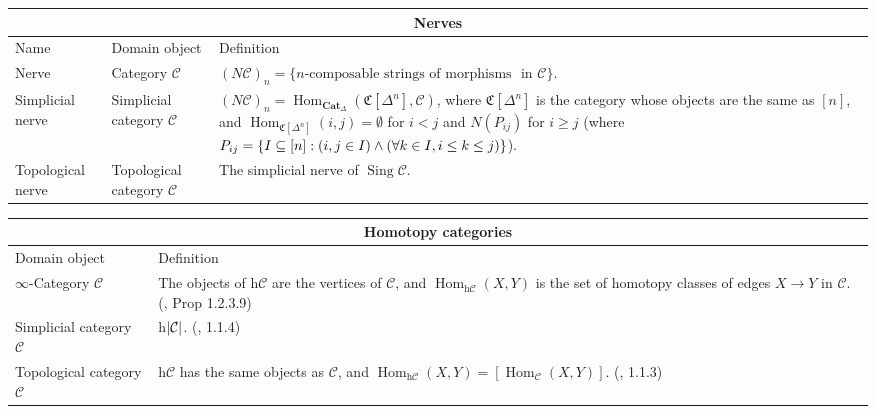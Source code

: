 \documentclass{article}
\DeclareMathOperator{\Hom}{Hom}
\DeclareMathOperator{\Sing}{Sing}
\def\subq{\ensuremath\subseteq}
\begin{document}
\begin{centre}
\begin{tabular}{ |p{3cm}||p{5cm}|p{7cm}|}
 \hline
 \multicolumn{3}{|c|}{Nerves}\\
 \hline
 Name& Domain object & Definition\\
  \hline\hline
  Nerve & Category \(\mathcal{C}\) & \((N\mathcal{C})_n=\text{\{}n\text{-composable strings of morphisms}\) \(\text{ in } \mathcal{C}\text{\}}\). \\
 \hline
 Simplicial nerve & Simplicial category \(\mathcal{C}\) & \((N \mathcal{C})_n=\Hom_{\textbf{Cat}_\Delta}(\mathfrak{C}[\Delta^n], \mathcal{C})\), where \(\mathfrak{C}[\Delta^n]\) is the category whose objects are the same as \([n]\), and \(\Hom_{\mathfrak{C}[\Delta^n]}(i,j)=\emptyset\) for \(i<j\) and \(N(P_{ij})\) for \(i\geq j\) (where \(P_{ij}=\{I \subq [n] : (i, j \in I)\wedge (\forall k \in I, i \leq k \leq j)\}\)).\\
 \hline
 Topological nerve & Topological category \(\mathcal{C}\) & The simplicial nerve of \(\Sing \mathcal{C}\).\\
 \hline
\end{tabular}

\text{}

\text{}

\begin{tabular}{ |p{5cm}||p{8cm}|}
 \hline
 \multicolumn{2}{|c|}{Homotopy categories}\\
 \hline
 Domain object & Definition\\
  \hline\hline
  \(\infty\)-Category \(\mathcal{C}\) & The objects of h\(\mathcal{C}\) are the vertices of \(\mathcal{C}\), and \(\Hom_{\text{h}\mathcal{C}}(X,Y)\) is the set of homotopy classes of edges \(X\to Y\) in \(\mathcal{C}\). (\autocite{htt}, Prop 1.2.3.9)\\
  \hline
  Simplicial category \(\mathcal{C}\) & h\(\lvert\mathcal{C}\rvert\). (\autocite{htt}, 1.1.4) \\ 
 \hline
   Topological category \(\mathcal{C}\) & h\(\mathcal{C}\) has the same objects as \(\mathcal{C}\), and \(\Hom_{\text{h}\mathcal{C}}(X,Y)=[\Hom_\mathcal{C}(X,Y)]\). (\autocite{htt}, 1.1.3) \\
  \hline 
\end{tabular}

\text{}

\text{}


\end{centre}
\end{document}
